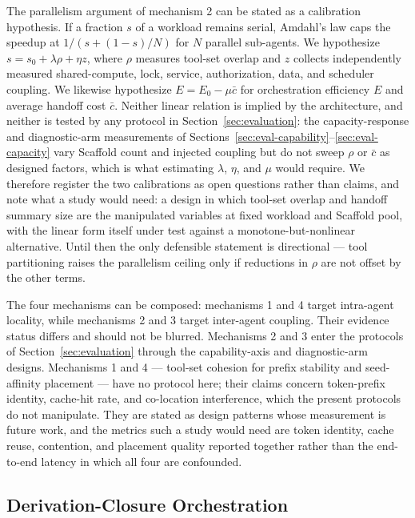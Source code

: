 The parallelism argument of mechanism 2 can be stated as a calibration hypothesis. If a fraction $s$ of a workload remains serial, Amdahl's law caps the speedup at $1/(s+(1-s)/N)$ for $N$ parallel sub-agents. We hypothesize $s=s_0+\lambda\rho+\eta z$, where $\rho$ measures tool-set overlap and $z$ collects independently measured shared-compute, lock, service, authorization, data, and scheduler coupling. We likewise hypothesize $E=E_0-\mu\bar{c}$ for orchestration efficiency $E$ and average handoff cost $\bar{c}$. Neither linear relation is implied by the architecture, and neither is tested by any protocol in Section~\ref{sec:evaluation}: the capacity-response and diagnostic-arm measurements of Sections~\ref{sec:eval-capability}--\ref{sec:eval-capacity} vary Scaffold count and injected coupling but do not sweep $\rho$ or $\bar{c}$ as designed factors, which is what estimating $\lambda$, $\eta$, and $\mu$ would require. We therefore register the two calibrations as open questions rather than claims, and note what a study would need: a design in which tool-set overlap and handoff summary size are the manipulated variables at fixed workload and Scaffold pool, with the linear form itself under test against a monotone-but-nonlinear alternative. Until then the only defensible statement is directional --- tool partitioning raises the parallelism ceiling only if reductions in $\rho$ are not offset by the other terms.

The four mechanisms can be composed: mechanisms 1 and 4 target intra-agent locality, while mechanisms 2 and 3 target inter-agent coupling. Their evidence status differs and should not be blurred. Mechanisms 2 and 3 enter the protocols of Section~\ref{sec:evaluation} through the capability-axis and diagnostic-arm designs. Mechanisms 1 and 4 --- tool-set cohesion for prefix stability and seed-affinity placement --- have no protocol here; their claims concern token-prefix identity, cache-hit rate, and co-location interference, which the present protocols do not manipulate. They are stated as design patterns whose measurement is future work, and the metrics such a study would need are token identity, cache reuse, contention, and placement quality reported together rather than the end-to-end latency in which all four are confounded.

\subsection{Derivation-Closure Orchestration}
\label{sec:derivation-closure}

